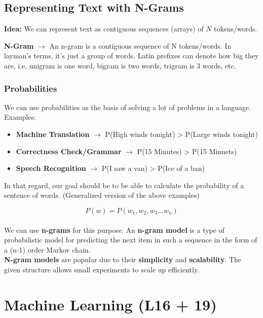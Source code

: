 \documentclass[english, 10pt]{article}
\begin{document}
\subsection{Representing Text with N-Grams}

\textbf{Idea:} We can represent text as contiguous sequences (arrays) of $N$ tokens/words.

\begin{tcolorbox}[title=Definition:,colframe=red!75!black,colback=red!5!white,arc=0pt,fonttitle=\bfseries]
\textbf{N-Gram} $\rightarrow$ An n-gram is a contiguous sequence of N tokens/words. In layman's terms, it's just a group of words. Latin prefixes can denote how big they are, i.e. unigram is one word, bigram is two words, trigram is 3 words, etc.
\end{tcolorbox}

\subsubsection{Probabilities}

We can use probabilities as the basis of solving a lot of problems in a language. Examples:

\begin{itemize}
	\item \textbf{Machine Translation} $\rightarrow$ P(High winds tonight) > P(Large winds tonight)
	\item \textbf{Correctness Check/Grammar} $\rightarrow$ P(15 Minutes) > P(15 Minuets)
	\item \textbf{Speech Recognition} $\rightarrow$ P(I saw a van) > P(Ice of a ban)
\end{itemize}

In that regard, our goal should be to be able to calculate the probability of a sentence of words. (Generalized version of the above examples)

$$P(w)=P(w_1,w_2,w_3 ... w_n)$$\\

We can use \textbf{n-grams} for this purpose. An \textbf{n-gram model} is a type of probabilistic model for predicting the next item in such a sequence in the form of a (n-1) order Markov chain.\\

\textbf{N-gram models} are popular due to their \textbf{simplicity} and \textbf{scalability}. The given structure allows small experiments to scale up efficiently.

\section{Machine Learning (L16 + 19)}
\end{document}
